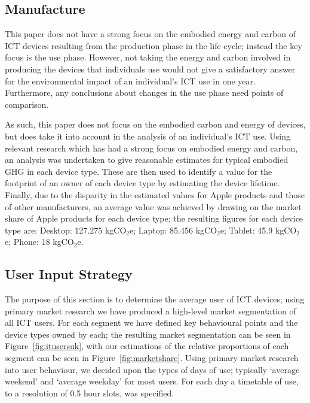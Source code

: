 \documentclass[conference]{IEEEtran}
\begin{document}
\subsection{Manufacture}


This paper does not have a strong focus on the embodied energy and
carbon of ICT devices resulting from the production phase in the life
cycle; instead the key focus is the use phase. However, not taking the
energy and carbon involved in producing the devices that individuals
use would not give a satisfactory answer for the environmental impact
of an individual's ICT use in one year. Furthermore, any conclusions
about changes in the use phase need points of comparison.

As such, this paper does not focus on the
embodied carbon and energy of devices, but does take it into account
in the analysis of an individual's ICT use. Using relevant
research which has had a strong focus on embodied energy and carbon,
an analysis was undertaken to give reasonable estimates for typical
embodied GHG in each device type. These are then used to identify a
value for the footprint of an owner of each device type by estimating
the device lifetime. Finally, due to the disparity in the estimated
values for Apple products and those of other manufacturers, an average
value was achieved by drawing on the market share of Apple products
for each device type; the resulting figures for each device type
are: Desktop: 127.275 kgCO$_2$e; Laptop: 85.456 kgCO$_2$e; Tablet:
45.9 kgCO$_2$e; Phone: 18 kgCO$_2$e.

\subsection{User Input Strategy}

The purpose of this section is to determine the average user of ICT
devices; using primary market research we have produced a high-level
market segmentation of all ICT users. For each segment we have defined
key behavioural points and the device types owned by each; the
resulting market segmentation can be seen in
Figure~\ref{fig:itusersuk}, with our estimations of the relative
proportions of each segment can be seen in
Figure~\ref{fig:marketshare}.  Using primary market research into user
behaviour, we decided upon the types of days of use; typically
`average weekend' and `average weekday' for most users. For each day a
timetable of use, to a resolution of 0.5 hour slots, was specified.
\end{document}
